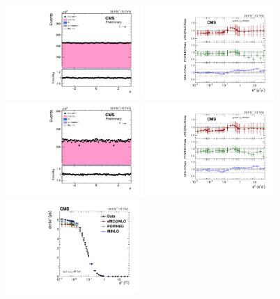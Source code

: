 \begin{figure}
	\centering
	\includegraphics[width=0.45\textwidth]{figures/zpt/zmm_phi.pdf}
	\includegraphics[width=0.45\textwidth]{figures/zpt/zmm_phi_ratio.pdf}
	\includegraphics[width=0.45\textwidth]{figures/zpt/zee_phi.pdf}
	\includegraphics[width=0.45\textwidth]{figures/zpt/zee_phi_ratio.pdf}
	\includegraphics[width=0.45\textwidth]{figures/zpt/zll_phi.pdf}

\end{figure}
